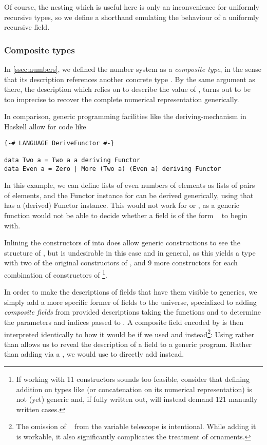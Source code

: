 Of course, the nesting which is useful here is only an inconvenience for uniformly recursive types, so we define a shorthand
emulating the behaviour of a uniformly recursive field.

\subsubsection{Composite types}
In \autoref{ssec:numbers}, we defined the number system  as a \emph{composite type}, in the sense that its description references another concrete type . By the same argument as there, the description  which relies on  to describe the value of , turns out to be too imprecise to recover the complete numerical representation generically. 

In comparison, generic programming facilities like the deriving-mechanism in Haskell allow for code like
\begin{verbatim}
{-# LANGUAGE DeriveFunctor #-}

data Two a = Two a a deriving Functor
data Even a = Zero | More (Two a) (Even a) deriving Functor    
\end{verbatim}
In this example, we can define lists of even numbers of elements as lists of pairs of elements, and the Functor instance for  can be derived generically, using that  has a (derived) Functor instance. This would not work for  or , as a generic function would not be able to decide whether a field is of the form \  to begin with. 

Inlining the constructors of  into  does allow generic constructions to see the structure of , but is undesirable in this case and in general, as this yields a type with two of the original constructors of , and 9 more constructors for each combination of constructors of \footnote{If working with 11 constructors sounds too feasible, consider that defining addition on types like  (or concatenation on its numerical representation) is not (yet) generic and, if fully written out, will instead demand 121 manually written cases.}.

In order to make the descriptions of fields that have them visible to generics, we simply add a more specific former of fields to the universe, specialized to adding \emph{composite fields} from provided descriptions
taking the functions  and  to determine the parameters and indices passed to . A composite field encoded by  is then interpreted identically to how it would be if we used  and  instead\footnote{The omission of \  from the variable telescope is intentional. While adding it is workable, it also significantly complicates the treatment of ornaments.}:
Using  rather than  allows us to reveal the description of a field to a generic program. Rather than adding  via a , we would use  to directly add  instead.

